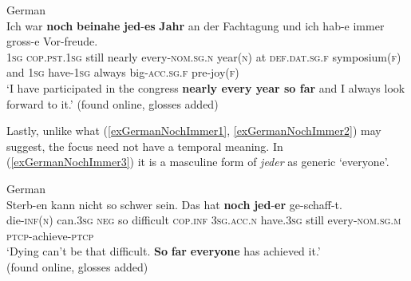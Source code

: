 \begin{exe}
	\ex German\label{exGermanNochImmer2}\\
	\gll Ich war \textbf{noch} \textbf{beinahe} \textbf{jed}-\textbf{es} \textbf{Jahr} an der Fachtagung und ich hab-e immer gross-e Vor-freude.\\
	1\textsc{sg} \textsc{cop}.\textsc{pst}.1\textsc{sg} still nearly every-\textsc{nom}.\textsc{sg}.\textsc{n} year(\textsc{n}) at \textsc{def}.\textsc{dat}.\textsc{sg}.\textsc{f} symposium(\textsc{f}) and 1\textsc{sg} have-1\textsc{sg} always big-\textsc{acc}.\textsc{sg}.\textsc{f} pre-joy(\textsc{f})\\
	\glt \lq I have participated in the congress \textbf{nearly every year so far} and I always look forward to it.\rq{ }(found online, glosses added)%
\end{exe}

Lastly, unlike what (\ref{exGermanNochImmer1}, \ref{exGermanNochImmer2}) may suggest, the focus need not have a temporal meaning. In (\ref{exGermanNochImmer3}) it is a masculine form of \textit{jeder} as generic \lq everyone\rq{}.
	
\begin{exe}
	\ex German\label{exGermanNochImmer3}\\
	\gll Sterb-en kann nicht so schwer sein. Das hat \textbf{noch} \textbf{jed}-\textbf{er} ge-schaff-t.\\
	die-\textsc{inf}(\textsc{n}) can.3\textsc{sg} \textsc{neg} so difficult \textsc{cop}.\textsc{inf} 3\textsc{sg}.\textsc{acc}.\textsc{n} have.3\textsc{sg} still every-\textsc{nom}.\textsc{sg}.\textsc{m} \textsc{ptcp}-achieve-\textsc{ptcp}\\
	\glt \lq Dying can’t be that difficult. \textbf{So} \textbf{far} \textbf{everyone} has achieved it.\rq{}
	\\(found online, glosses added)%
\end{exe}

